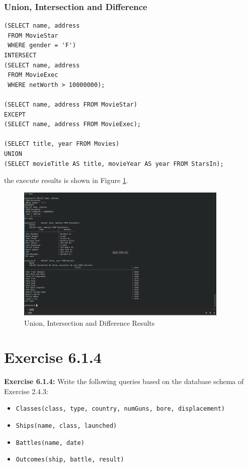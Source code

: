 \documentclass{cshwk}
\begin{document}
\subsubsection{Union, Intersection and Difference}

\begin{lstlisting}          
(SELECT name, address
 FROM MovieStar
 WHERE gender = 'F')
INTERSECT
(SELECT name, address
 FROM MovieExec
 WHERE netWorth > 10000000);

(SELECT name, address FROM MovieStar)
EXCEPT
(SELECT name, address FROM MovieExec);

(SELECT title, year FROM Movies)
UNION
(SELECT movieTitle AS title, movieYear AS year FROM StarsIn);
\end{lstlisting}

the execute results is shown in Figure \ref{fig:union-intersection-difference}.
\begin{figure}[htbp]
    \centering
    \includegraphics[width=0.9\textwidth]{hw4-12.png}
    \caption{Union, Intersection and Difference Results}
    \label{fig:union-intersection-difference}
\end{figure}

\section{Exercise 6.1.4 }
\textbf{Exercise 6.1.4:} Write the following queries based on the database schema of Exercise 2.4.3:

\begin{itemize}
    \item \texttt{Classes(class, type, country, numGuns, bore, displacement)}
    \item \texttt{Ships(name, class, launched)}
    \item \texttt{Battles(name, date)}
    \item \texttt{Outcomes(ship, battle, result)}
\end{itemize}
\end{document}
